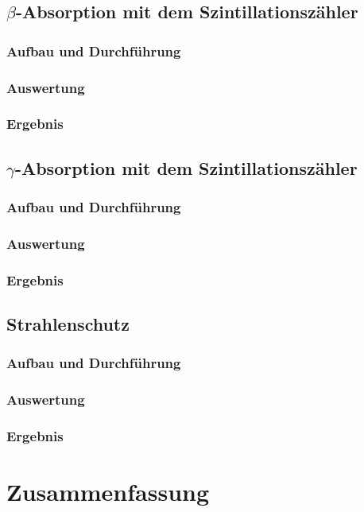 \documentclass{../Misc/MontavonLaTeX/Montavon}
\begin{document}
\subsection{$\beta$-Absorption mit dem Szintillationszähler}
\subsubsection{Aufbau und Durchführung}
\subsubsection{Auswertung}
\subsubsection{Ergebnis}

\subsection{$\gamma$-Absorption mit dem Szintillationszähler}
\subsubsection{Aufbau und Durchführung}
\subsubsection{Auswertung}
\subsubsection{Ergebnis}

\subsection{Strahlenschutz}
\subsubsection{Aufbau und Durchführung}
\subsubsection{Auswertung}
\subsubsection{Ergebnis}

\section{Zusammenfassung}
\end{document}
